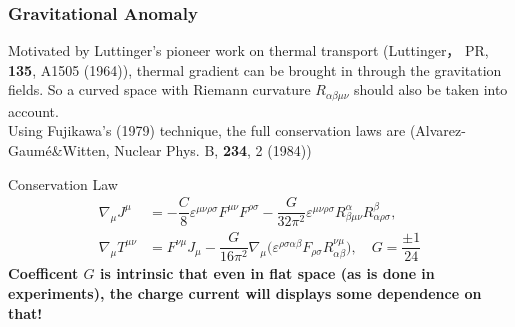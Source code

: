 \documentclass[10pt,aspectratio=43,xcolor=x11names,t]{beamer}%
\begin{document}
		\begin{frame}\frametitle{Gravitational Anomaly}
			Motivated by Luttinger's pioneer work on thermal transport ({\scriptsize Luttinger， PR, \textbf{135}, A1505 (1964)}), {\color{red}thermal gradient can be brought in through the gravitation fields}. So a curved space with Riemann curvature $R_{\alpha\beta\mu\nu}$ should also be taken into account.\\[1em]
			\pause
			Using Fujikawa's (1979) technique, the full conservation laws are ({\scriptsize Alvarez-Gaumé\&Witten, Nuclear Phys. B, \textbf{234}, 2 (1984)})
			\begin{block}{Conservation Law}
				\begin{align*}
					\nabla_\mu J^\mu&=-\dfrac{C}{8}\varepsilon^{\mu\nu\rho\sigma}F^{\mu\nu}F^{\rho\sigma}-\dfrac{G}{32\pi^2}\varepsilon^{\mu\nu\rho\sigma}R^\alpha_{\beta\mu\nu}R^\beta_{\alpha\rho\sigma},\\
					\nabla_\mu T^{\mu\nu}&=F^{\nu\mu}J_\mu-\dfrac{G}{16\pi^2}\nabla_\mu\bigg(\varepsilon^{\rho\sigma\alpha\beta}F_{\rho\sigma}R_{\alpha\beta}^{\nu\mu}\bigg),\quad G=\dfrac{\pm1}{24}
				\end{align*}
				\textbf{\color{red}Coefficent $G$ is intrinsic that even in flat space (as is done in experiments), the charge current will displays some dependence on that!}
			\end{block}
		\end{frame}
\end{document}
